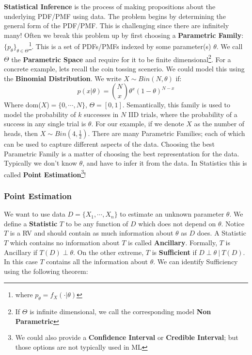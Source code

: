 \documentclass[]{article}
\theoremstyle{mattstyle}
\theoremstyle{definition}
\begin{document}
\textbf{Statistical Inference}  is the process of making propositions about the underlying PDF/PMF using data. The problem begins by determining the general form of the PDF/PMF. This is challenging since there are infinitely many! 
Often we break this problem up by first choosing a \textbf{Parametric Family}: $\{p_{\theta}\}_{\theta\in\Theta}$\footnote{where $p_{\theta} = f_X(\cdot|\theta)$ }. This is a set of PDFs/PMFs indexed by some parameter(s) $\theta$. We call $\Theta$ the \textbf{Parametric Space} and require for it to be finite dimensional\footnote{If $\Theta$ is infinite dimensional, we call the corresponding model \textbf{Non Parametric}}. For a concrete example, lets recall the coin tossing scenerio. We could model this using the \textbf{Binomial Distribution}. We write $X\sim Bin(N, \theta)$ if:
$$ p(x|\theta) = {N \choose x}\theta^x(1-\theta)^{N-x} $$
Where dom($X$)$=\{0, \cdots, N\}$, $\Theta=[0,1]$. Semantically, this family is used to model the probability of $k$ successes in $N$ IID trials, where the probability of a success in any single trial is $\theta$. For our example, if we denote $X$ as the number of heads, then $X \sim Bin(4, \frac{1}{2})$. There are many Parametric Families; each of which can be used to capture different aspects of the data. Choosing the best Parametric Family is a matter of choosing the best representation for the data. Typically we don't know $\theta$, and have to infer it from the data. In Statistics this is called \textbf{Point Estimation}\footnote{We could also provide a \textbf{Confidence Interval} or \textbf{Credible Interval}; but those options are not typically used in ML}!

\newpage

\subsubsection{Point Estimation}

We want to use data $D = \{X_1, \cdots, X_n\}$ to estimate an unknown parameter $\theta$. We define a \textbf{Statistic} $T$ to be any function of $D$ which does not depend on $\theta$. Notice $T$ is a RV and should contain as much information about $\theta$ as $D$ does. A Statistic $T$ which contains no information about $T$ is called \textbf{Ancillary}. Formally, $T$ is Ancillary if $T(D) \perp \theta$. On the other extreme, $T$ is \textbf{Sufficient} if $D \perp \theta \ | \ T(D)$. In this case $T$ contains all the information about $\theta$. We can identify Sufficiency using the following theorem:
\end{document}
